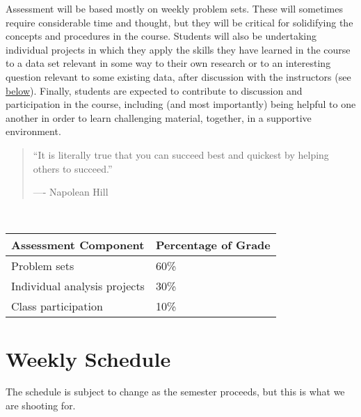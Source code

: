 \documentclass[]{book}
\begin{document}
Assessment will be based mostly on weekly problem sets. These will sometimes require
considerable time and thought, but they will be critical for solidifying the concepts
and procedures in the course. Students will also be undertaking individual projects
in which they apply the skills they have learned in the course to a data set
relevant in some way to their own research or to an interesting question relevant
to some existing data, after discussion with the instructors (see \protect\hyperlink{indproj}{below}).
Finally, students are expected to contribute to discussion and participation in the course,
including (and most importantly) being helpful to one another in order to learn challenging material,
together, in a supportive environment.

\begin{quote}
``It is literally true that you can succeed best
and quickest by helping others to succeed.''

\hfill ---- Napolean Hill
\end{quote}

~

\begin{longtable}[]{@{}ll@{}}
\toprule
Assessment Component & Percentage of Grade\tabularnewline
\midrule
\endhead
Problem sets & 60\%\tabularnewline
Individual analysis projects & 30\%\tabularnewline
Class participation & 10\%\tabularnewline
\bottomrule
\end{longtable}

\hypertarget{weekly-schedule}{%
\section*{Weekly Schedule}\label{weekly-schedule}}

The schedule is subject to change as the semester proceeds, but this
is what we are shooting for.
\end{document}
